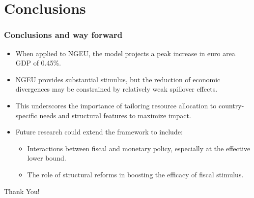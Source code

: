 \documentclass[british,english,aspectratio=169]{beamer}
\begin{document}
\section{Conclusions}
\begin{frame}
  \frametitle{Conclusions and way forward}
\begin{itemize}

    \item When applied to NGEU, the model projects a peak increase in euro area GDP of 0.45\%.
   
    \item NGEU provides substantial stimulus, but the reduction of economic divergences may be constrained by relatively weak spillover effects.
    
    \item This underscores the importance of tailoring resource allocation to country-specific needs and structural features to maximize impact.
    
    \item Future research could extend the framework to include:
    \begin{itemize}
        \item Interactions between fiscal and monetary policy, especially at the effective lower
bound.
        \item The role of structural reforms in boosting the efficacy of fiscal stimulus.
    \end{itemize}
\end{itemize}
\end{frame}


\begin{frame}
    \centering
    \Huge
    Thank You!
\end{frame}
\end{document}
